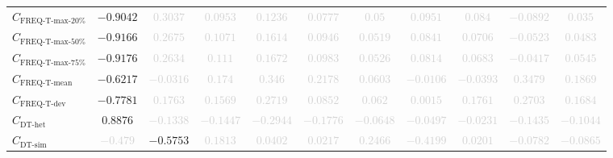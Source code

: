 \documentclass{standalone}
\newcommand{\freqmaxtwentyname}{\text{FREQ-T-max-20\%}}
\newcommand{\freqmaxtwenty}{C_{\freqmaxtwentyname}}
\newcommand{\freqmaxfiftyname}{\text{FREQ-T-max-50\%}}
\newcommand{\freqmaxfifty}{C_{\freqmaxfiftyname}}
\newcommand{\freqmaxseventyfivename}{\text{FREQ-T-max-75\%}}
\newcommand{\freqmaxseventyfive}{C_{\freqmaxseventyfivename}}
\newcommand{\freqmeanname}{\text{FREQ-T-mean}}
\newcommand{\freqmean}{C_{\freqmeanname}}
\newcommand{\freqdevname}{\text{FREQ-T-dev}}
\newcommand{\freqdev}{C_{\freqdevname}}
\newcommand{\dthetname}{\text{DT-het}}
\newcommand{\dthet}{C_{\dthetname}}
\newcommand{\dtsimname}{\text{DT-sim}}
\newcommand{\dtsim}{C_{\dtsimname}}
\begin{document}
\begin{tabular}{lcccccccccc}
$\freqmaxtwenty$ & $-0.9042$ & \textcolor{lightgray}{$0.3037$} & \textcolor{lightgray}{$0.0953$} & \textcolor{lightgray}{$0.1236$} & \textcolor{lightgray}{$0.0777$} & \textcolor{lightgray}{$0.05$} & \textcolor{lightgray}{$0.0951$} & \textcolor{lightgray}{$0.084$} & \textcolor{lightgray}{$-0.0892$} & \textcolor{lightgray}{$0.035$} \\ 
$\freqmaxfifty$ & $-0.9166$ & \textcolor{lightgray}{$0.2675$} & \textcolor{lightgray}{$0.1071$} & \textcolor{lightgray}{$0.1614$} & \textcolor{lightgray}{$0.0946$} & \textcolor{lightgray}{$0.0519$} & \textcolor{lightgray}{$0.0841$} & \textcolor{lightgray}{$0.0706$} & \textcolor{lightgray}{$-0.0523$} & \textcolor{lightgray}{$0.0483$} \\ 
$\freqmaxseventyfive$ & $-0.9176$ & \textcolor{lightgray}{$0.2634$} & \textcolor{lightgray}{$0.111$} & \textcolor{lightgray}{$0.1672$} & \textcolor{lightgray}{$0.0983$} & \textcolor{lightgray}{$0.0526$} & \textcolor{lightgray}{$0.0814$} & \textcolor{lightgray}{$0.0683$} & \textcolor{lightgray}{$-0.0417$} & \textcolor{lightgray}{$0.0545$} \\ 
$\freqmean$ & $-0.6217$ & \textcolor{lightgray}{$-0.0316$} & \textcolor{lightgray}{$0.174$} & \textcolor{lightgray}{$0.346$} & \textcolor{lightgray}{$0.2178$} & \textcolor{lightgray}{$0.0603$} & \textcolor{lightgray}{$-0.0106$} & \textcolor{lightgray}{$-0.0393$} & \textcolor{lightgray}{$0.3479$} & \textcolor{lightgray}{$0.1869$} \\ 
$\freqdev$ & $-0.7781$ & \textcolor{lightgray}{$0.1763$} & \textcolor{lightgray}{$0.1569$} & \textcolor{lightgray}{$0.2719$} & \textcolor{lightgray}{$0.0852$} & \textcolor{lightgray}{$0.062$} & \textcolor{lightgray}{$0.0015$} & \textcolor{lightgray}{$0.1761$} & \textcolor{lightgray}{$0.2703$} & \textcolor{lightgray}{$0.1684$} \\ 
$\dthet$ & $0.8876$ & \textcolor{lightgray}{$-0.1338$} & \textcolor{lightgray}{$-0.1447$} & \textcolor{lightgray}{$-0.2944$} & \textcolor{lightgray}{$-0.1776$} & \textcolor{lightgray}{$-0.0648$} & \textcolor{lightgray}{$-0.0497$} & \textcolor{lightgray}{$-0.0231$} & \textcolor{lightgray}{$-0.1435$} & \textcolor{lightgray}{$-0.1044$} \\ 
$\dtsim$ & \textcolor{lightgray}{$-0.479$} & $-0.5753$ & \textcolor{lightgray}{$0.1813$} & \textcolor{lightgray}{$0.0402$} & \textcolor{lightgray}{$0.0217$} & \textcolor{lightgray}{$0.2466$} & \textcolor{lightgray}{$-0.4199$} & \textcolor{lightgray}{$0.0201$} & \textcolor{lightgray}{$-0.0782$} & \textcolor{lightgray}{$-0.0865$} \\ 

\end{tabular}
\end{document}
